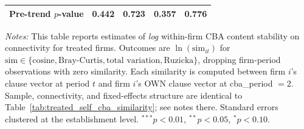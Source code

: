 \begin{table}[H]
\begin{tabular}{lcccc}
Pre-trend $p$-value & 0.442 & 0.723 & 0.357 & 0.776 \\
\bottomrule
\end{tabular}
\begin{minipage}{\linewidth}
\footnotesize\vspace{4pt}
\textit{Notes:} This table reports estimates of \emph{log} within-firm CBA content stability on connectivity for treated firms. Outcomes are $\ln(\text{sim}_{it})$ for $\text{sim} \in \{\text{cosine}, \text{Bray-Curtis}, \text{total variation}, \text{Ruzicka}\}$, dropping firm-period observations with zero similarity. Each similarity is computed between firm $i$'s clause vector at period $t$ and firm $i$'s OWN clause vector at cba\_period $= 2$. Sample, connectivity, and fixed-effects structure are identical to Table~\ref{tab:treated_self_cba_similarity}; see notes there. Standard errors clustered at the establishment level. $^{***}p<0.01$, $^{**}p<0.05$, $^{*}p<0.10$.
\end{minipage}
\end{table}
